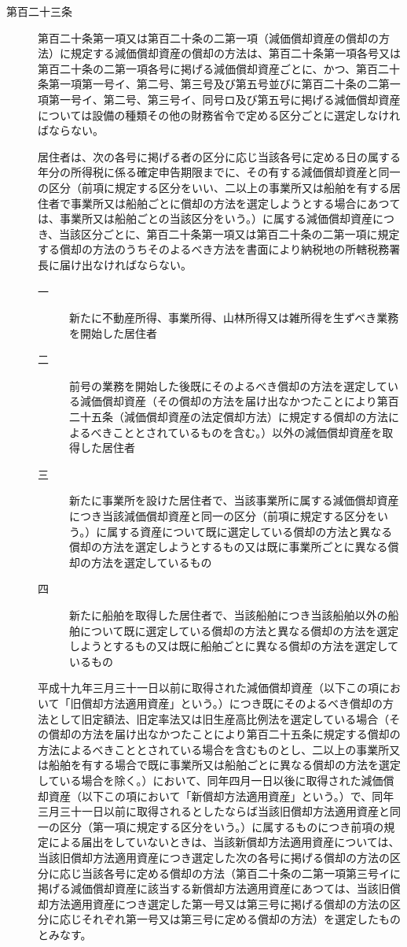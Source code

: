 \documentclass[twocolumn,a4j,10pt]{ltjtarticle}
\begin{document}
\begin{description}
\item[第百二十三条]第百二十条第一項又は第百二十条の二第一項（減価償却資産の償却の方法）に規定する減価償却資産の償却の方法は、第百二十条第一項各号又は第百二十条の二第一項各号に掲げる減価償却資産ごとに、かつ、第百二十条第一項第一号イ、第二号、第三号及び第五号並びに第百二十条の二第一項第一号イ、第二号、第三号イ、同号ロ及び第五号に掲げる減価償却資産については設備の種類その他の財務省令で定める区分ごとに選定しなければならない。
\item[]居住者は、次の各号に掲げる者の区分に応じ当該各号に定める日の属する年分の所得税に係る確定申告期限までに、その有する減価償却資産と同一の区分（前項に規定する区分をいい、二以上の事業所又は船舶を有する居住者で事業所又は船舶ごとに償却の方法を選定しようとする場合にあつては、事業所又は船舶ごとの当該区分をいう。）に属する減価償却資産につき、当該区分ごとに、第百二十条第一項又は第百二十条の二第一項に規定する償却の方法のうちそのよるべき方法を書面により納税地の所轄税務署長に届け出なければならない。
\begin{description}
\item[一]新たに不動産所得、事業所得、山林所得又は雑所得を生ずべき業務を開始した居住者
\item[二]前号の業務を開始した後既にそのよるべき償却の方法を選定している減価償却資産（その償却の方法を届け出なかつたことにより第百二十五条（減価償却資産の法定償却方法）に規定する償却の方法によるべきこととされているものを含む。）以外の減価償却資産を取得した居住者
\item[三]新たに事業所を設けた居住者で、当該事業所に属する減価償却資産につき当該減価償却資産と同一の区分（前項に規定する区分をいう。）に属する資産について既に選定している償却の方法と異なる償却の方法を選定しようとするもの又は既に事業所ごとに異なる償却の方法を選定しているもの
\item[四]新たに船舶を取得した居住者で、当該船舶につき当該船舶以外の船舶について既に選定している償却の方法と異なる償却の方法を選定しようとするもの又は既に船舶ごとに異なる償却の方法を選定しているもの
\end{description}
\item[]平成十九年三月三十一日以前に取得された減価償却資産（以下この項において「旧償却方法適用資産」という。）につき既にそのよるべき償却の方法として旧定額法、旧定率法又は旧生産高比例法を選定している場合（その償却の方法を届け出なかつたことにより第百二十五条に規定する償却の方法によるべきこととされている場合を含むものとし、二以上の事業所又は船舶を有する場合で既に事業所又は船舶ごとに異なる償却の方法を選定している場合を除く。）において、同年四月一日以後に取得された減価償却資産（以下この項において「新償却方法適用資産」という。）で、同年三月三十一日以前に取得されるとしたならば当該旧償却方法適用資産と同一の区分（第一項に規定する区分をいう。）に属するものにつき前項の規定による届出をしていないときは、当該新償却方法適用資産については、当該旧償却方法適用資産につき選定した次の各号に掲げる償却の方法の区分に応じ当該各号に定める償却の方法（第百二十条の二第一項第三号イに掲げる減価償却資産に該当する新償却方法適用資産にあつては、当該旧償却方法適用資産につき選定した第一号又は第三号に掲げる償却の方法の区分に応じそれぞれ第一号又は第三号に定める償却の方法）を選定したものとみなす。

\end{description}
\end{document}
